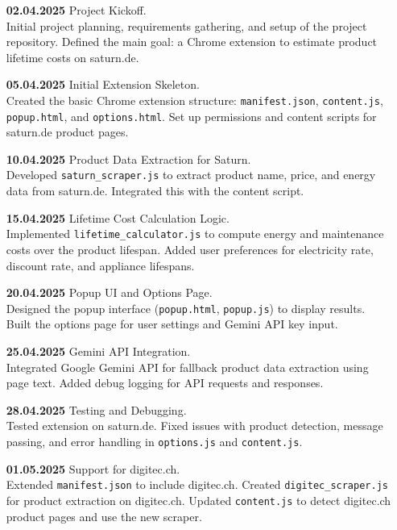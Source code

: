 \documentclass{article}
\begin{document}
\begin{itemize}
  \item[\textbf{02.04.2025}] Project Kickoff.\\
  Initial project planning, requirements gathering, and setup of the project repository. Defined the main goal: a Chrome extension to estimate product lifetime costs on saturn.de.

  \item[\textbf{05.04.2025}] Initial Extension Skeleton.\\
  Created the basic Chrome extension structure: \texttt{manifest.json}, \texttt{content.js}, \texttt{popup.html}, and \texttt{options.html}. Set up permissions and content scripts for saturn.de product pages.

  \item[\textbf{10.04.2025}] Product Data Extraction for Saturn.\\
  Developed \texttt{saturn_scraper.js} to extract product name, price, and energy data from saturn.de. Integrated this with the content script.

  \item[\textbf{15.04.2025}] Lifetime Cost Calculation Logic.\\
  Implemented \texttt{lifetime_calculator.js} to compute energy and maintenance costs over the product lifespan. Added user preferences for electricity rate, discount rate, and appliance lifespans.

  \item[\textbf{20.04.2025}] Popup UI and Options Page.\\
  Designed the popup interface (\texttt{popup.html}, \texttt{popup.js}) to display results. Built the options page for user settings and Gemini API key input.

  \item[\textbf{25.04.2025}] Gemini API Integration.\\
  Integrated Google Gemini API for fallback product data extraction using page text. Added debug logging for API requests and responses.

  \item[\textbf{28.04.2025}] Testing and Debugging.\\
  Tested extension on saturn.de. Fixed issues with product detection, message passing, and error handling in \texttt{options.js} and \texttt{content.js}.

  \item[\textbf{01.05.2025}] Support for digitec.ch.\\
  Extended \texttt{manifest.json} to include digitec.ch. Created \texttt{digitec_scraper.js} for product extraction on digitec.ch. Updated \texttt{content.js} to detect digitec.ch product pages and use the new scraper.


\end{itemize}
\end{document}
